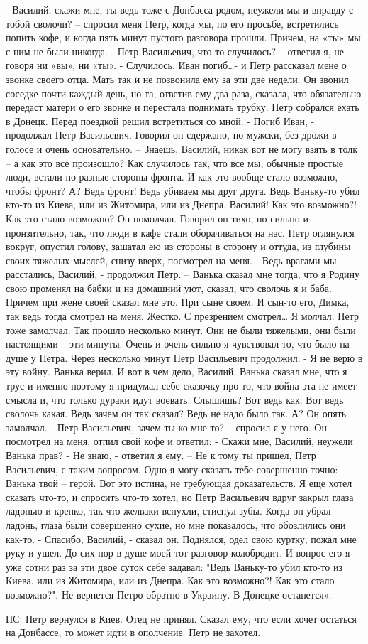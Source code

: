 - Василий, скажи мне, ты ведь тоже с Донбасса родом, неужели мы и вправду с тобой сволочи? – спросил меня Петр, когда мы, по его просьбе, встретились попить кофе, и когда пять минут пустого разговора прошли. 
Причем, на «ты» мы с ним не были никогда.
- Петр Васильевич, что-то случилось? – ответил я, не говоря ни «вы», ни «ты». 
- Случилось. Иван погиб…- и Петр рассказал мене о звонке своего отца. Мать так и не позвонила ему за эти две недели. Он звонил соседке почти каждый день, но та, ответив ему два раза, сказала, что обязательно передаст матери о его звонке и перестала поднимать трубку. Петр собрался ехать в Донецк. Перед поездкой решил встретиться со мной. 
- Погиб Иван, - продолжал Петр Васильевич. Говорил он сдержано, по-мужски, без дрожи в голосе и очень основательно. – Знаешь, Василий, никак вот не могу взять в толк – а как это все произошло? Как случилось так, что все мы, обычные простые люди, встали по разные стороны фронта. И как это вообще стало возможно, чтобы фронт? А? Ведь фронт! Ведь убиваем мы друг друга. Ведь Ваньку-то убил кто-то из Киева, или из Житомира, или из Днепра. Василий! Как это возможно?! Как это стало возможно?
Он помолчал. Говорил он тихо, но сильно и пронзительно, так, что люди в кафе стали оборачиваться на нас. Петр оглянулся вокруг, опустил голову, зашатал ею из стороны в сторону и оттуда, из глубины своих тяжелых мыслей, снизу вверх, посмотрел на меня.
- Ведь врагами мы расстались, Василий, - продолжил Петр. – Ванька сказал мне тогда, что я Родину свою променял на бабки и на домашний уют, сказал, что сволочь я и баба. Причем при жене своей сказал мне это. При сыне своем. И сын-то его, Димка, так ведь тогда смотрел на меня. Жестко. С презрением смотрел…
Я молчал. Петр тоже замолчал. Так прошло несколько минут. Они не были тяжелыми, они были настоящими – эти минуты. Очень и очень сильно я чувствовал то, что было на душе у Петра. 
Через несколько минут Петр Васильевич продолжил:
- Я не верю в эту войну. Ванька верил. И вот в чем дело, Василий. Ванька сказал мне, что я трус и именно поэтому я придумал себе сказочку про то, что война эта не имеет смысла и, что только дураки идут воевать. Слышишь? Вот ведь как. Вот ведь сволочь какая. Ведь зачем он так сказал? Ведь не надо было так. А?
Он опять замолчал. 
- Петр Васильевич, зачем ты ко мне-то? – спросил я у него.
Он посмотрел на меня, отпил свой кофе и ответил:
- Скажи мне, Василий, неужели Ванька прав?
- Не знаю, - ответил я ему. – Не к тому ты пришел, Петр Васильевич, с таким вопросом. Одно я могу сказать тебе совершенно точно: Ванька твой – герой. Вот это истина, не требующая доказательств. 
Я еще хотел сказать что-то, и спросить что-то хотел, но Петр Васильевич вдруг закрыл глаза ладонью и крепко, так что желваки вспухли, стиснул зубы. 
Когда он убрал ладонь, глаза были совершенно сухие, но мне показалось, что обозлились они как-то. 
- Спасибо, Василий, - сказал он. Поднялся, одел свою куртку, пожал мне руку и ушел. 
До сих пор в душе моей тот разговор колобродит. И вопрос его я уже сотни раз за эти двое суток себе задавал: "Ведь Ваньку-то убил кто-то из Киева, или из Житомира, или из Днепра. Как это возможно?! Как это стало возможно?".
Не вернется Петро обратно в Украину. В Донецке останется».

ПС: Петр вернулся в Киев. Отец не принял. Сказал ему, что если хочет остаться
на Донбассе, то может идти в ополчение. Петр не захотел.
\restorecr
